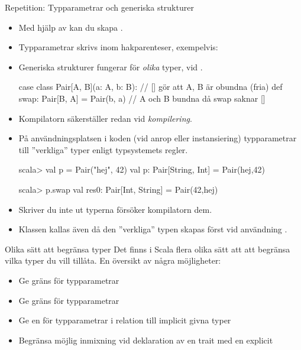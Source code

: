 



\begin{Slide}{Repetition: Typparametrar och generiska strukturer}
\begin{itemize}\SlideFontSmall
\item Med hjälp av   kan du skapa  .
\item Typparametrar skrivs inom hakparenteser, exempelvis: \code{ [T, U] }
\item Generiska strukturer fungerar för \emph{olika} typer,  vid . 
\begin{Code}
case class Pair[A, B](a: A, b: B):  // [] gör att A, B är obundna (fria)
  def swap: Pair[B, A] = Pair(b, a) // A och B bundna då swap saknar []
\end{Code}
\pause
\item Kompilatorn säkerställer   redan vid \emph{kompilering}.
\item På användningsplatsen i koden (vid anrop eller instansiering)  typparametrar till ''verkliga'' typer enligt typsystemets regler. 
\begin{REPL}
scala> val p = Pair("hej", 42)
val p: Pair[String, Int] = Pair(hej,42)

scala> p.swap
val res0: Pair[Int, String] = Pair(42,hej)
\end{REPL}
\pause
\item Skriver du inte ut typerna försöker kompilatorn   dem.
\item Klassen  kallas även   då den ''verkliga'' typen skapas först vid användning .
\end{itemize}
\end{Slide}



\begin{Slide}{Olika sätt att begränsa typer}
Det finns i Scala flera olika sätt att att begränsa vilka typer du vill tillåta. En översikt av några möjligheter:
\begin{itemize}
  \item Ge  gräns för typparametrar 
  \item Ge  gräns för typparametrar 
  \item Ge en  för typparametrar i relation till implicit givna typer 
  \item Begränsa möjlig inmixning vid deklaration av en trait med en explicit   
\end{itemize}
\end{Slide}

